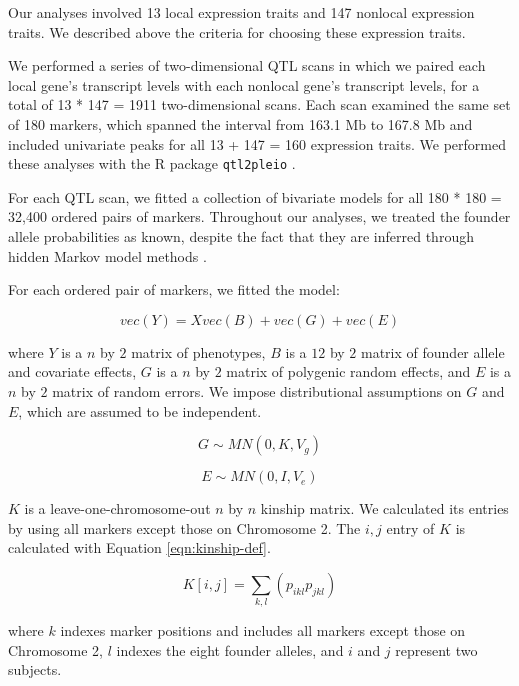 \documentclass{article}
\begin{document}
Our analyses involved 13 local expression traits and 147 nonlocal expression traits. We described above the criteria for choosing these expression traits.

We performed a series of two-dimensional QTL scans in which we paired each local gene's transcript levels with each nonlocal gene's transcript levels, for a total of 13 * 147 = 1911 two-dimensional scans. Each scan examined the same set of 180 markers, which spanned the interval from 163.1 Mb to 167.8 Mb and included univariate peaks for all 13 + 147 = 160 expression traits. We performed these analyses with the R package \texttt{qtl2pleio} \citep{qtl2pleio}.

For each QTL scan, we fitted a collection of bivariate models for all 180 * 180 = 32,400 ordered pairs of markers. Throughout our analyses, we treated the founder allele probabilities as known, despite the fact that they are inferred through hidden Markov model methods \citep{broman2012genotype, broman2012haplotype, Broman2018}. 

For each ordered pair of markers, we fitted the model:

\begin{equation}
    vec(Y) = Xvec(B) + vec(G) + vec(E)
    \label{eqn:bivariate-model}
\end{equation}

where $Y$ is a $n$ by $2$ matrix of phenotypes, $B$ is a $12$ by $2$ matrix of founder allele and covariate effects, $G$ is a $n$ by $2$ matrix of polygenic random effects, and $E$ is a $n$ by $2$ matrix of random errors. We impose distributional assumptions on $G$ and $E$, which are assumed to be independent.

\begin{equation}
    G \sim MN(0, K, V_g)
\end{equation}

\begin{equation}
    E \sim MN(0, I, V_e)
\end{equation}

$K$ is a leave-one-chromosome-out $n$ by $n$ kinship matrix. We calculated its entries by using all markers except those on Chromosome 2. The $i, j$ entry of $K$ is calculated with Equation \ref{eqn:kinship-def}.

\begin{equation}
    K[i, j] = \sum_{k,l} (p_{ikl} p_{jkl})
    \label{eqn:kinship-def}
\end{equation}

where $k$ indexes marker positions and includes all markers except those on Chromosome 2, $l$ indexes the eight founder alleles, and $i$ and $j$ represent two subjects. 
\end{document}
